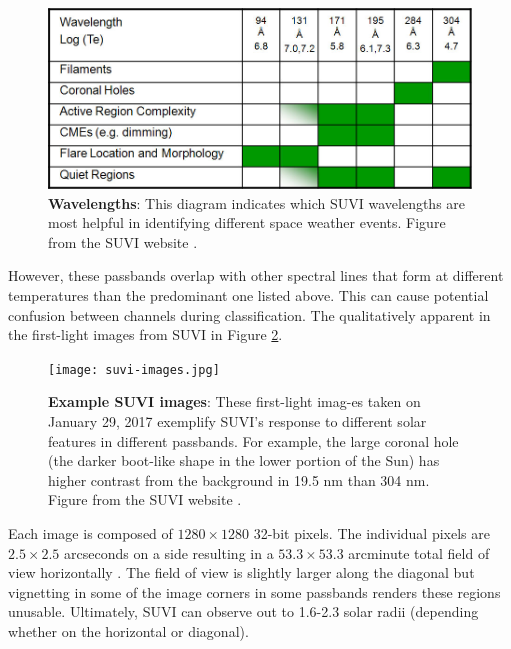 \documentclass[twoside]{report}
\begin{document}
\begin{figure}[ht]
  \begin{center}
    \includegraphics[scale=0.4]{suvi-wavelength-log.jpg}
    \caption{{\bf Wavelengths}: This diagram indicates which SUVI wavelengths are most helpful in identifying different space weather events. Figure from the SUVI website \cite{suviwebsite}.}
    \label{fig:suviwavelength}
 \end{center}
\end{figure}

However, these passbands overlap with other spectral lines that form at different temperatures than the predominant one listed above. This can cause potential confusion between channels during classification. The qualitatively apparent in the first-light images from SUVI in Figure \ref{fig:suviimages}.

\begin{figure}[hbt]
  \begin{center}
    \texttt{[image: suvi-images.jpg]}
    \caption{{\bf Example SUVI images}: These first-light imag-es taken on January 29, 2017 exemplify SUVI's response to different solar features in different passbands. For example, the large coronal hole (the darker boot-like shape in the lower portion of the Sun) has higher contrast from the background in 19.5 nm than 304 nm. Figure from the SUVI website \cite{suviwebsite}.}
    \label{fig:suviimages}
 \end{center}
\end{figure}


Each image is composed of $1280\times1280$ 32-bit pixels. The individual pixels are $2.5\times2.5$ arcseconds on a side resulting in a $53.3 \times 53.3$ arcminute total field of view horizontally \cite{suvibg2}. The field of view is slightly larger along the diagonal but vignetting in some of the image corners in some passbands renders these regions unusable. Ultimately, SUVI can observe out to 1.6-2.3 solar radii (depending whether on the horizontal or diagonal). 
\end{document}
